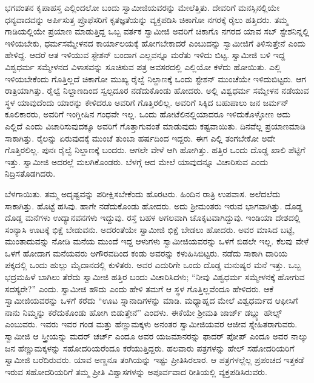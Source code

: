  ಭಗವಂತನ ಕೃಪಾಹಸ್ತ ಎಲ್ಲಿಂದಲೋ ಬಂದು ಸ್ವಾಮೀಜಿಯವರನ್ನು ಮೇಲೆತ್ತಿತು. ದೇವರಿಗೆ ಮನಸ್ಸಿನಲ್ಲಿಯೇ ಧನ್ಯವಾದವನ್ನು ಅರ್ಪಿಸುತ್ತ ಪ್ರೊಫೆಸರಿಗೆ ಕೃತಜ್ಞತೆಯನ್ನು ವ್ಯಕ್ತಪಡಿಸಿ ಚಿಕಾಗೋ ನಗರಕ್ಕೆ ರೈಲು ಹತ್ತಿದರು. ತಮ್ಮ ಗಾಡಿಯಲ್ಲಿಯೇ ಪ್ರಯಾಣ ಮಾಡುತ್ತಿದ್ದ ಒಬ್ಬ ವರ್ತಕ ಸ್ವಾಮೀಜಿ ಅವರಿಗೆ ಚಿಕಾಗೊ ನಗರದ ಯಾವ ಸಬ್ ಸ್ಟೇಶನಿನ್ನಲ್ಲಿ ಇಳಿಯಬೇಕು, ಧರ್ಮಸಮ್ಮೇಳನದ ಕಾರ್ಯಾಲಯಕ್ಕೆ ಹೋಗಬೇಕಾದರೆ ಎಂಬುದನ್ನು ಸ್ವಾಮೀಜಿಗೆ ತಿಳಿಸುತ್ತೇನೆ ಎಂದು ಹೇಳಿದ್ದ. ಆದರೆ ಆತ ಇಳಿಯುವ ಸ್ಟೇಶನ್ ಬಂದಾಗ ಎಲ್ಲವನ್ನೂ ಮರೆತು ಇಳಿದು ಬಿಟ್ಟ. ಸ್ವಾಮೀಜಿ ಬಳಿ ಇದ್ದ ವಿಶ್ವಧರ್ಮ ಸಮ್ಮೇಳನದ ವಿಳಾಸವನ್ನು ಸೂಚಿಸುವ ಪತ್ರ ಅವಸರದಲ್ಲಿ ಎಲ್ಲಿಯೋ ಕಳೆದು ಹೋಯಿತು. ಎಲ್ಲಿ ಇಳಿಯಬೇಕೆಂದು ಗೊತ್ತಿಲ್ಲದೆ ಚಿಕಾಗೋ ಮುಖ್ಯ ರೈಲ್ವೆ ನಿಲ್ದಾಣಕ್ಕೆ ಒಂದು ಸ್ಟೇಶನ್ ಮುಂಚೆಯೇ ಇಳಿದುಬಿಟ್ಟರು. ಆಗ ರಾತ್ರಿಯಾಗಿತ್ತು. ರೈಲ್ವೆ ನಿಲ್ದಾಣದಿಂದ ಸ್ವಲ್ಪದೂರ ನಡೆದುಕೊಂಡು ಹೋದರು. ಅಲ್ಲಿ ವಿಶ್ವಧರ್ಮ ಸಮ್ಮೇಳನ ನಡೆಯುವ ಸ್ಥಳ ಯಾವುದೆಂದು ಯಾರನ್ನು ಕೇಳಿದರೂ ಅವರಿಗೆ ಗೊತ್ತಿರಲಿಲ್ಲ. ಅವರಿಗೆ ಸಿಕ್ಕಿದ ಬಹುಪಾಲು ಜನ ಜರ್ಮನ್ ಕೂಲಿಕಾರರು, ಅವರಿಗೆ ಇಂಗ್ಲೀಷಿನ ಗಂಧವೇ ಇಲ್ಲ. ಒಂದು ಹೋಟೆಲಿನಲ್ಲಿಯಾದರೂ ಇಳಿದುಕೊಳ್ಳೋಣ ಅದು ಎಲ್ಲಿದೆ ಎಂದು ವಿಚಾರಿಸುವುದಕ್ಕೂ ಅವರಿಗೆ ಗೊತ್ತಾಗುವಂತೆ ಮಾಡುವುದು ಕಷ್ಟವಾಯಿತು. ದಿನವೆಲ್ಲ ಪ್ರಯಾಣಮಾಡಿ ಸಾಕಾಗಿತ್ತು. ರೈಲನ್ನು ಏರುವುದಕ್ಕೆ ಮುಂಚೆ ತುಂಬಾ ಹರ್ಷದಿಂದ ಇದ್ದರು. ಈಗ ಎಲ್ಲಿ ತಂಗಬೇಕೋ ಅದೇ ಗೊತ್ತಿರಲಿಲ್ಲ. ಪುನಃ ರೈಲ್ವೆ ನಿಲ್ದಾಣಕ್ಕೆ ಬಂದರು. ಆಗಲೇ ವೇಳೆ ಆಗಿ ಹೋಗಿತ್ತು. ಹತ್ತಿರ ಒಂದು ದೊಡ್ಡ ಖಾಲಿ ಪೆಟ್ಟಿಗೆ ಇತ್ತು. ಸ್ವಾಮೀಜಿ ಅದರಲ್ಲೆ ಮಲಗಿಕೊಂಡರು. ಬೆಳಗ್ಗೆ ಆದ ಮೇಲೆ ಯಾವುದನ್ನೂ ವಿಚಾರಿಸುವ ಎಂದು ನಿದ್ರಿಸತೊಡಗಿದರು. 

 ಬೆಳಗಾಯಿತು. ತಮ್ಮ ಅದೃಷ್ಟವನ್ನು ಪರೀಕ್ಷಿಸಬೇಕೆಂದು ಹೊರಟರು. ಹಿಂದಿನ ರಾತ್ರಿ ಉಪವಾಸ. ಅಲೆದಲೆದು ಸಾಕಾಗಿತ್ತು. ಹೊಟ್ಟೆ ಹಸಿವು. ಹಾಗೇ ನಡೆದುಕೊಂಡು ಹೋದರು. ಅದು ಶ‍್ರೀಮಂತರು ಇರುವ ಭಾಗವಾಗಿತ್ತು. ದೊಡ್ಡ ದೊಡ್ಡ ಮನೆಗಳು ಉದ್ಯಾನವನಗಳು ಇದ್ದುವು. ರಸ್ತೆ ಬಹಳ ಅಗಲವಾಗಿ ಚೊಕ್ಕಟವಾಗಿದ್ದುವು. ಇಂಡಿಯಾ ದೇಶದಲ್ಲಿ ಸಂನ್ಯಾಸಿ ಊಟಕ್ಕೆ ಭಿಕ್ಷೆ ಬೇಡುವನು. ಅದರಂತೆಯೇ ಸ್ವಾಮೀಜಿ ಭಿಕ್ಷೆ ಬೇಡಲು ಹೋದರು. ಅವರ ಮಾಸಿದ ಬಟ್ಟೆ, ಮುಂತಾದುವನ್ನು ನೋಡಿ ಮನೆಯ ಮುಂದೆ ಇದ್ದ ಆಳುಗಳು ಸ್ವಾಮೀಜಿಯವರನ್ನು ಒಳಗೆ ಬಿಡಲೇ ಇಲ್ಲ. ಕೆಲವು ವೇಳೆ ಒಳಗೆ ಹೋದಾಗ ಮನೆಯವರು ಅಗೌರವದಿಂದ ಕಂಡು ಅವರನ್ನು ಕಳುಹಿಸಿಬಿಟ್ಟರು. ನಡೆದು ಸಾಕಾಗಿ ದಾರಿಯ ಪಕ್ಕದಲ್ಲಿ ಒಂದು ಹುಲ್ಲು ಮೈದಾನದಲ್ಲಿ ಕುಳಿತರು. ಅವರ ಎದುರಿಗೇ ಒಂದು ದೊಡ್ಡ ಮನುಷ್ಯರ ಮನೆ ಇತ್ತು. ಒಬ್ಬ ಭದ್ರಮಹಿಳೆ ಬಾಗಿಲು ತೆರೆದು ಸ್ವಾಮೀಜಿ ಹತ್ತಿರ ಬಂದು ವಿಚಾರಿಸಿದಳು; “ನೀವು ವಿಶ್ವಧರ್ಮ ಸಮ್ಮೇಳನಕ್ಕೆ ಹೋಗುವ ಸದಸ್ಯರೇ?” ಎಂದು. ಸ್ವಾಮೀಜಿ ಹೌದು ಎಂದು ಹೇಳಿ ತಮಗೆ ಆ ಸ್ಥಳ ಗೊತ್ತಿಲ್ಲವೆಂದೂ ಹೇಳಿದರು. ಆಕೆ ಸ್ವಾಮೀಜಿಯವರನ್ನು ಒಳಗೆ ಕರೆದು “ಊಟ ಸ್ನಾನಾದಿಗಳನ್ನು ಮಾಡಿ. ಮಧ್ಯಾಹ್ನದ ಮೇಲೆ ವಿಶ್ವಧರ್ಮದ ಆಫೀಸಿಗೆ ನಾನು ನಿಮ್ಮನ್ನು ಕರೆದುಕೊಂಡು ಹೋಗಿ ಬಿಡುತ್ತೇನೆ” ಎಂದಳು. ಈಕೆಯೇ ಶ‍್ರೀಮತಿ ಜಾರ್ಜ್ ಡಬ್ಲ್ಯು ಹೇಲ್ಸ್ ಎಂಬುವರು. ಇವರು ಇವರ ಗಂಡ ಮತ್ತು ಹೆಣ್ಣುಮಕ್ಕಳು ಅನಂತರ ಸ್ವಾಮೀಜಿಯವರ ಆಜೀವ ಸ್ನೇಹಿತರಾಗುವರು. ಸ್ವಾಮೀಜಿ ಆ ಸ್ತ್ರೀಯನ್ನು ಮದರ್ ಚರ್ಚ್ ಎಂದೂ ಅವರ ಯಜಮಾನರನ್ನು ಫಾದರ್ ಪೋಪ್ ಎಂದೂ ಅವರ ನಾಲ್ಕು ಜನ ಹೆಣ್ಣುಮಕ್ಕಳನ್ನು ಸಹೋದರಿಯರೆಂದೂ ಕರೆಯುತ್ತಿದ್ದರು. ಹಲವಾರು ಪತ್ರಗಳನ್ನು ಹೇಲ್ ಸಹೋದರಿಯರಿಗೆ ಸ್ವಾಮೀಜಿ ಬರೆದಿರುವರು. ಯಾವ ಅಣ್ಣನೂ ತಂಗಿಯನ್ನು ಇಷ್ಟು ಪ್ರೀತಿಸಿರಲಾರ. ಆ ಪತ್ರಗಳಲ್ಲೆಲ್ಲ ಪ್ರಪಂಚದ ಇತ್ತಕಡೆ ಇರುವ ಸಹೋದರಿಯರಿಗೆ ತಮ್ಮ ಪ್ರೀತಿ ವಿಶ್ವಾಸಗಳನ್ನು ಅಪೂರ್ವವಾದ ರೀತಿಯಲ್ಲಿ ವ್ಯಕ್ತಪಡಿಸಿರುವರು. 

